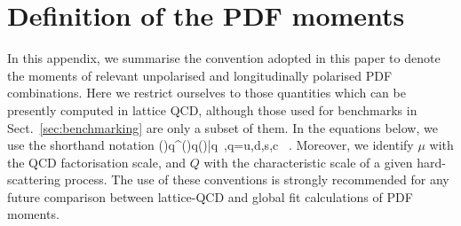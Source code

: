 \section{Definition of the PDF moments}
\label{app:notation}

In this appendix, we summarise the convention adopted in this paper to denote the
moments of relevant unpolarised and longitudinally polarised PDF combinations.
%
Here we restrict ourselves to those
quantities which can be presently computed in lattice QCD,
although those used for benchmarks in Sect.~\ref{sec:benchmarking} are only
a subset of them.
%
In the equations below, we use the shorthand notation
\be
(\Delta)q^\pm \equiv (\Delta)q\pm(\Delta)\bar{q}\, ,\qquad q=u,d,s,c \, .
\ee
Moreover, we identify $\mu$  with the QCD factorisation scale,
and $Q$ with the characteristic scale of a given 
hard-scattering process.
%
The use of these conventions is strongly recommended for any future
comparison between lattice-QCD and global fit calculations of PDF moments.

